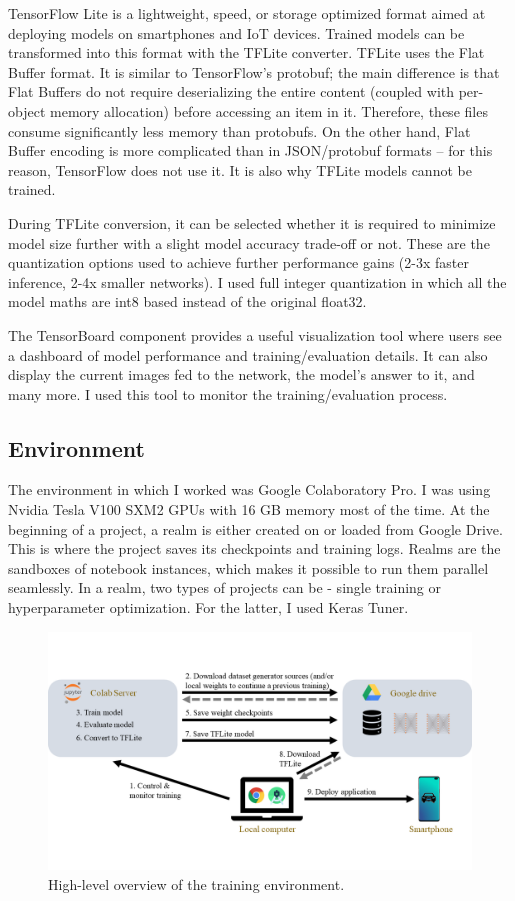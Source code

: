 TensorFlow Lite is a lightweight, speed, or storage optimized format aimed at deploying models on smartphones and IoT devices. Trained models can be transformed into this format with the TFLite converter. TFLite uses the Flat Buffer\cite{Flatbuf} format. It is similar to TensorFlow’s protobuf; the main difference is that Flat Buffers do not require deserializing the entire content (coupled with per-object memory allocation) before accessing an item in it. Therefore, these files consume significantly less memory than protobufs. On the other hand, Flat Buffer encoding is more complicated than in JSON/protobuf formats – for this reason, TensorFlow does not use it. It is also why TFLite models cannot be trained.

During TFLite conversion, it can be selected whether it is required to minimize model size further with a slight model accuracy trade-off or not. These are the quantization\cite{TensorFlowQuant} options used to achieve further performance gains (2-3x faster inference, 2-4x smaller networks). I used full integer quantization in which all the model maths are int8 based instead of the original float32.

The TensorBoard component provides a useful visualization tool where users see a dashboard of model performance and training/evaluation details. It can also display the current images fed to the network, the model’s answer to it, and many more. I used this tool to monitor the training/evaluation process.

\subsection{Environment}

The environment in which I worked was Google Colaboratory Pro. I was using Nvidia Tesla V100 SXM2 GPUs with 16 GB memory most of the time. At the beginning of a project, a realm is either created on or loaded from Google Drive. This is where the project saves its checkpoints and training logs. Realms are the sandboxes of notebook instances, which makes it possible to run them parallel seamlessly. In a realm, two types of projects can be - single training or hyperparameter optimization. For the latter, I used Keras Tuner.

\begin{figure}[htb]
 \centerline{\includegraphics[width=1.0\columnwidth]{.//Figure/Technologies/Slide1.PNG}}
 \caption{High-level overview of the training environment.}
 \label{fig:simple}
\end{figure}

